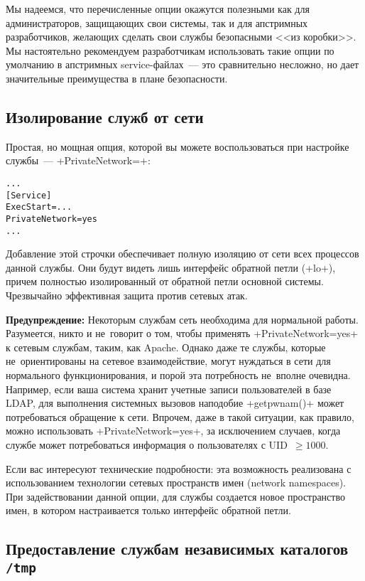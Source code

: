 \documentclass[10pt,oneside,a4paper]{article}
\newenvironment{caveat}[1][]{\smallskip\par\textbf{Предупреждение#1: }}%
	{\smallskip\par}
\begin{document}
Мы надеемся, что перечисленные опции окажутся полезными как для администраторов,
защищающих свои системы, так и для апстримных разработчиков, желающих сделать
свои службы безопасными <<из коробки>>. Мы настоятельно рекомендуем
разработчикам использовать такие опции по умолчанию в апстримных
service-файлах~--- это сравнительно несложно, но дает значительные преимущества
в плане безопасности.

\subsection{Изолирование служб от сети}

Простая, но мощная опция, которой вы можете воспользоваться при настройке
службы~--- +PrivateNetwork=+:
\begin{Verbatim}
...
[Service]
ExecStart=...
PrivateNetwork=yes
...
\end{Verbatim}
Добавление этой строчки обеспечивает полную изоляцию от сети всех процессов
данной службы. Они будут видеть лишь интерфейс обратной петли (+lo+), причем
полностью изолированный от обратной петли основной системы.  Чрезвычайно
эффективная защита против сетевых атак.

\begin{caveat}
Некоторым службам сеть необходима для нормальной работы. Разумеется, никто и
не~говорит о том, чтобы применять +PrivateNetwork=yes+ к сетевым службам, таким,
как Apache. Однако даже те службы, которые не~ориентированы на сетевое
взаимодействие, могут нуждаться в сети для нормального функционирования, и порой
эта потребность не~вполне очевидна. Например, если ваша система хранит
учетные записи пользователей в базе LDAP, для выполнения системных вызовов
наподобие +getpwnam()+ может потребоваться обращение к сети.  Впрочем, даже в
такой ситуации, как правило, можно использовать +PrivateNetwork=yes+, за
исключением случаев, когда службе может потребоваться информация о пользователях
с UID~$\geq1000$.
\end{caveat}

Если вас интересуют технические подробности: эта возможность реализована с
использованием технологии сетевых пространств имен (network namespaces). При
задействовании данной опции, для службы создается новое пространство имен, в
котором настраивается только интерфейс обратной петли.

\subsection{Предоставление службам независимых каталогов \texttt{/tmp}}
\end{document}
